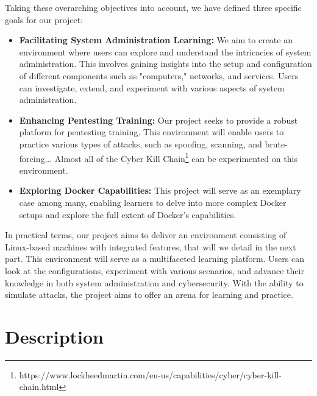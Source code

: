 \documentclass[a4paper,11pt,singlespacing]{article}
\begin{document}
Taking these overarching objectives into account, we have defined three specific goals for our project:

\begin{itemize}
    \item \textbf{Facilitating System Administration Learning:} We aim to create an environment where users can explore and understand the intricacies of system administration. This involves gaining insights into the setup and configuration of different components such as "computers," networks, and services. Users can investigate, extend, and experiment with various aspects of system administration.

    \item \textbf{Enhancing Pentesting Training:} Our project seeks to provide a robust platform for pentesting training. This environment will enable users to practice various types of attacks, such as spoofing, scanning, and brute-forcing... Almost all of the Cyber Kill Chain\footnote{https://www.lockheedmartin.com/en-us/capabilities/cyber/cyber-kill-chain.html} can be experimented on this environment.

    \item \textbf{Exploring Docker Capabilities:} This project will serve as an exemplary case among many, enabling learners to delve into more complex Docker setups and explore the full extent of Docker's capabilities.

\end{itemize}

In practical terms, our project aims to deliver an environment consisting of Linux-based machines with integrated features, that will we detail in the next part. This environment will serve as a multifaceted learning platform. Users can look at the configurations, experiment with various scenarios, and advance their knowledge in both system administration and cybersecurity. With the ability to simulate attacks, the project aims to offer an arena for learning and practice.

\section{Description}
\end{document}
